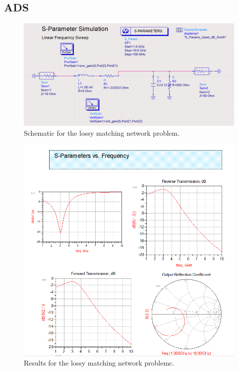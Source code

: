 
\subsection{ADS}
\begin{figure}[H]
    \centering
    \includegraphics[width=0.8\linewidth]{res/ADS/LossyMatchingNetworkSchematic.png}
    \caption{Schematic for the lossy matching network problem.}
    \label{fig:res/}
\end{figure}
\begin{figure}[H]
    \centering
    \includegraphics[width=0.8\linewidth]{res/ADS/LossyMatchingNetworkResults.png}
    \caption{Results for the lossy matching network problemc.}
    \label{fig:res/}
\end{figure}

